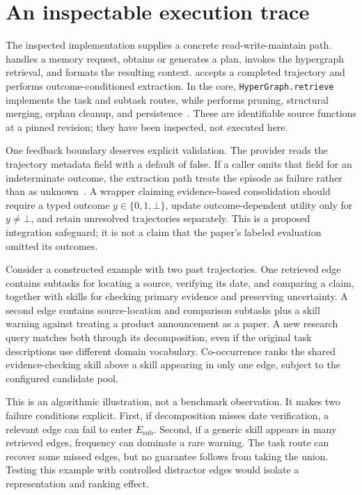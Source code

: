 \section{An inspectable execution trace}\label{sec:C15:trace}
The inspected implementation supplies a concrete read-write-maintain path.  handles a memory request, obtains or generates a plan, invokes the hypergraph retrieval, and formats the resulting context.  accepts a completed trajectory and performs outcome-conditioned extraction. In the core, \texttt{HyperGraph.retrieve} implements the task and subtask routes, while  performs pruning, structural merging, orphan cleanup, and persistence~\cite{repo_hyperskill2026}. These are identifiable source functions at a pinned revision; they have been inspected, not executed here.

One feedback boundary deserves explicit validation. The provider reads the trajectory metadata field  with a default of false. If a caller omits that field for an indeterminate outcome, the extraction path treats the episode as failure rather than as unknown~\cite{repo_hyperskill2026}. A wrapper claiming evidence-based consolidation should require a typed outcome $y\in\{0,1,\bot\}$, update outcome-dependent utility only for $y\ne\bot$, and retain unresolved trajectories separately. This is a proposed integration safeguard; it is not a claim that the paper's labeled evaluation omitted its outcomes.

Consider a constructed example with two past trajectories. One retrieved edge contains subtasks for locating a source, verifying its date, and comparing a claim, together with skills for checking primary evidence and preserving uncertainty. A second edge contains source-location and comparison subtasks plus a skill warning against treating a product announcement as a paper. A new research query matches both through its decomposition, even if the original task descriptions use different domain vocabulary. Co-occurrence ranks the shared evidence-checking skill above a skill appearing in only one edge, subject to the configured candidate pool.

This is an algorithmic illustration, not a benchmark observation. It makes two failure conditions explicit. First, if decomposition misses date verification, a relevant edge can fail to enter $E_{\mathrm{sub}}$. Second, if a generic skill appears in many retrieved edges, frequency can dominate a rare warning. The task route can recover some missed edges, but no guarantee follows from taking the union. Testing this example with controlled distractor edges would isolate a representation and ranking effect.

